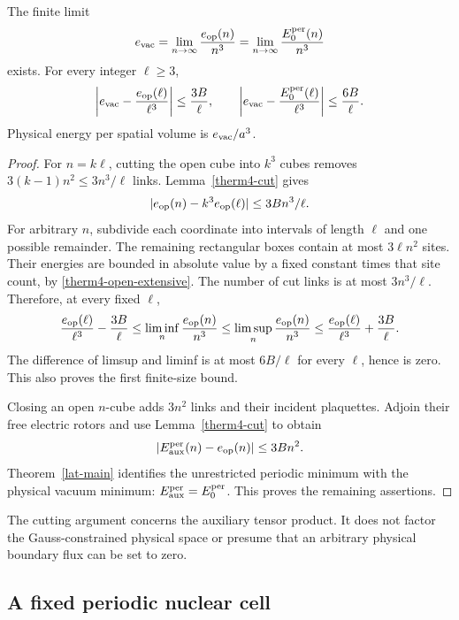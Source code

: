 \begin{theorem}
\label{therm4-vacuum-limit}
The finite limit
\begin{equation}
 e_{\rm vac}=\lim_{n\to\infty}\frac{e_{\rm op}(n)}{n^3}
            =\lim_{n\to\infty}\frac{E_0^{\rm per}(n)}{n^3}
 \label{therm4-vacuum-limit-eq}
\end{equation}
exists.  For every integer $\ell\ge3$,
\begin{equation}
 \left|e_{\rm vac}-\frac{e_{\rm op}(\ell)}{\ell^3}\right|
 \le\frac{3B}{\ell},\qquad
 \left|e_{\rm vac}-\frac{E_0^{\rm per}(\ell)}{\ell^3}\right|
 \le\frac{6B}{\ell}.
 \label{therm4-vacuum-rate}
\end{equation}
Physical energy per spatial volume is $e_{\rm vac}/a^3$.
\end{theorem}
\begin{proof}
For $n=k\ell$, cutting the open cube into $k^3$ cubes removes
$3(k-1)n^2\le3n^3/\ell$ links.  Lemma~\ref{therm4-cut} gives
\[
 |e_{\rm op}(n)-k^3e_{\rm op}(\ell)|\le3Bn^3/\ell.
\]
For arbitrary $n$, subdivide each coordinate into intervals of length
$\ell$ and one possible remainder.  The remaining rectangular boxes
contain at most $3\ell n^2$ sites.  Their energies are bounded in
absolute value by a fixed constant times that site count, by
\eqref{therm4-open-extensive}.  The number of cut links is at most
$3n^3/\ell$.  Therefore, at every fixed $\ell$,
\[
 \frac{e_{\rm op}(\ell)}{\ell^3}-\frac{3B}{\ell}
 \le\liminf_n\frac{e_{\rm op}(n)}{n^3}
 \le\limsup_n\frac{e_{\rm op}(n)}{n^3}
 \le\frac{e_{\rm op}(\ell)}{\ell^3}+\frac{3B}{\ell}.
\]
The difference of limsup and liminf is at most $6B/\ell$ for every
$\ell$, hence is zero.  This also proves the first finite-size bound.

Closing an open $n$-cube adds $3n^2$ links and their incident
plaquettes.  Adjoin their free electric rotors and use
Lemma~\ref{therm4-cut} to obtain
\[
 |E_{\rm aux}^{\rm per}(n)-e_{\rm op}(n)|\le3Bn^2.
\]
Theorem~\ref{lat-main} identifies the unrestricted periodic minimum
with the physical vacuum minimum: $E_{\rm aux}^{\rm per}=E_0^{\rm per}$.
This proves the remaining assertions.
\end{proof}

The cutting argument concerns the auxiliary tensor product.
It does not factor the Gauss-constrained physical space or presume
that an arbitrary physical boundary flux can be set to zero.

\subsection{A fixed periodic nuclear cell}

